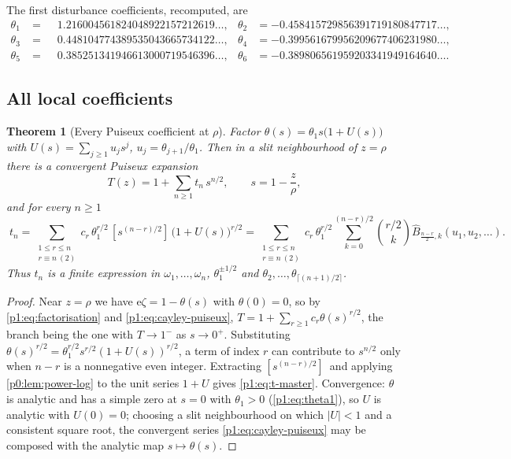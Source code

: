 \documentclass[11pt,a4paper,oneside]{book}
\theoremstyle{plain}
\newtheorem{theorem}{Theorem}[chapter]
\theoremstyle{definition}
\theoremstyle{remark}
\newcommand{\e}{\mathrm{e}}
\newcommand{\Coef}[1]{[#1]\,}
\newcommand{\OB}{\widehat{B}}
\begin{document}
The first disturbance coefficients, recomputed, are
\begin{equation}
\begin{aligned}
 \theta_1&=\phantom{-}1.216004561824048922157212619\ldots,&
 \theta_2&=-0.458415729856391719180847717\ldots,\\
 \theta_3&=\phantom{-}0.448104774389535043665734122\ldots,&
 \theta_4&=-0.399561679956209677406231980\ldots,\\
 \theta_5&=\phantom{-}0.385251341946613000719546396\ldots,&
 \theta_6&=-0.389806561959203341949164640\ldots .
\end{aligned}
\label{p1:eq:theta-numeric}
\end{equation}

\subsection{All local coefficients}

\begin{theorem}[Every Puiseux coefficient at $\rho$]
\label{p1:thm:t-coefficients}
Factor $\theta(s)=\theta_1s\bigl(1+U(s)\bigr)$ with $U(s)=\sum_{j\ge1}u_js^{j}$,
$u_j=\theta_{j+1}/\theta_1$.  Then in a slit neighbourhood of $z=\rho$ there is a convergent
Puiseux expansion
\begin{equation}
 T(z)=1+\sum_{n\ge1}t_n\,s^{n/2},
 \qquad s=1-\frac z\rho,
 \label{p1:eq:T-puiseux}
\end{equation}
and for every $n\ge1$
\begin{equation}
 \boxed{\;
 t_n=\sum_{\substack{1\le r\le n\\ r\equiv n\ (2)}}
 c_r\,\theta_1^{r/2}\,
 \Coef{s^{(n-r)/2}}\bigl(1+U(s)\bigr)^{r/2}
 =\sum_{\substack{1\le r\le n\\ r\equiv n\ (2)}}
 c_r\,\theta_1^{r/2}
 \sum_{k=0}^{(n-r)/2}\binom{r/2}{k}\OB_{\frac{n-r}2,k}(u_1,u_2,\ldots).\;}
 \label{p1:eq:t-master}
\end{equation}
Thus $t_n$ is a finite expression in $\omega_1,\ldots,\omega_n$, $\theta_1^{\pm1/2}$ and
$\theta_2,\ldots,\theta_{\lceil (n+1)/2\rceil}$.
\end{theorem}

\begin{proof}
Near $z=\rho$ we have $\e\zeta=1-\theta(s)$ with $\theta(0)=0$, so by
\cref{p1:eq:factorisation} and \cref{p1:eq:cayley-puiseux},
$T=1+\sum_{r\ge1}c_r\theta(s)^{r/2}$, the branch being the one with $T\to1^{-}$ as
$s\to0^{+}$.  Substituting $\theta(s)^{r/2}=\theta_1^{r/2}s^{r/2}(1+U(s))^{r/2}$, a term of
index $r$ can contribute to $s^{n/2}$ only when $n-r$ is a nonnegative even integer.
Extracting $\Coef{s^{(n-r)/2}}$ and applying \cref{p0:lem:power-log} to the unit series $1+U$
gives \cref{p1:eq:t-master}.  Convergence: $\theta$ is analytic and has a simple zero at $s=0$
with $\theta_1>0$ (\cref{p1:eq:theta1}), so $U$ is analytic with $U(0)=0$; choosing a slit
neighbourhood on which $|U|<1$ and a consistent square root, the convergent series
\cref{p1:eq:cayley-puiseux} may be composed with the analytic map $s\mapsto\theta(s)$.
\end{proof}
\end{document}
